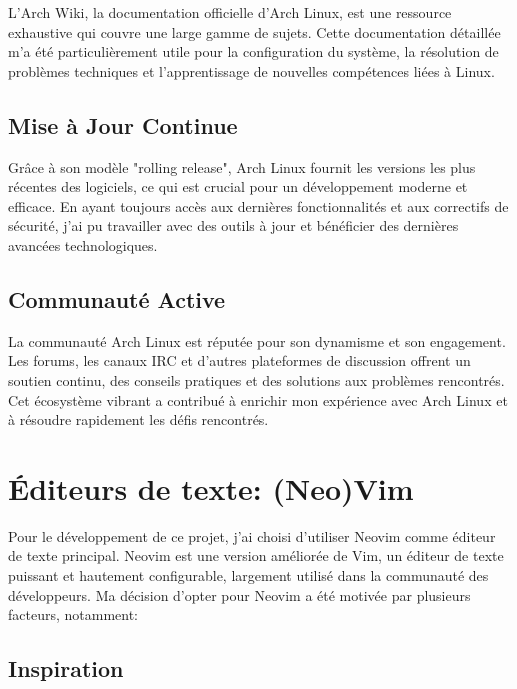 \hspace{16pt}L'Arch Wiki, la documentation officielle d'Arch Linux, est une ressource exhaustive qui couvre une large gamme de sujets. Cette documentation détaillée m'a été particulièrement utile pour la configuration du système, la résolution de problèmes techniques et l'apprentissage de nouvelles compétences liées à Linux.

\subsection{Mise à Jour Continue}

\hspace{16pt}Grâce à son modèle "rolling release", Arch Linux fournit les versions les plus récentes des logiciels, ce qui est crucial pour un développement moderne et efficace. En ayant toujours accès aux dernières fonctionnalités et aux correctifs de sécurité, j'ai pu travailler avec des outils à jour et bénéficier des dernières avancées technologiques.

\subsection{Communauté Active}

\hspace{16pt}La communauté Arch Linux est réputée pour son dynamisme et son engagement. Les forums, les canaux IRC et d'autres plateformes de discussion offrent un soutien continu, des conseils pratiques et des solutions aux problèmes rencontrés. Cet écosystème vibrant a contribué à enrichir mon expérience avec Arch Linux et à résoudre rapidement les défis rencontrés.


\section{Éditeurs de texte: (Neo)Vim}

\hspace{16pt}Pour le développement de ce projet, j'ai choisi d'utiliser Neovim comme éditeur de texte principal. Neovim est une version améliorée de Vim, un éditeur de texte puissant et hautement configurable, largement utilisé dans la communauté des développeurs. Ma décision d'opter pour Neovim a été motivée par plusieurs facteurs, notamment:

\subsection{Inspiration}

